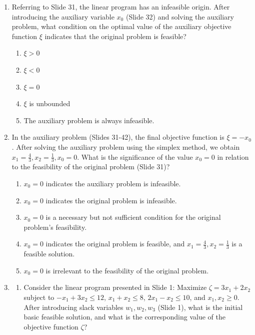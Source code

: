 \documentclass{article}%
\begin{document}
\begin{enumerate}
\begin{enumerate}
\end{enumerate}%
\vspace{1em}%
\item Referring to Slide 31, the linear program has an infeasible origin.  After introducing the auxiliary variable $ x_0 $ (Slide 32) and solving the auxiliary problem, what condition on the optimal value of the auxiliary objective function $ \xi $ indicates that the original problem is feasible?%
\begin{enumerate}%
\item $ \xi > 0 $%
\item $ \xi < 0 $%
\item $ \xi = 0 $%
\item $ \xi $ is unbounded%
\item The auxiliary problem is always infeasible.%
\end{enumerate}%
\vspace{1em}%
\item In the auxiliary problem (Slides 31-42), the final objective function is $ \xi = -x_0 $.  After solving the auxiliary problem using the simplex method, we obtain $ x_1 = \frac{4}{3}, x_2 = \frac{1}{3}, x_0 = 0 $. What is the significance of the value $ x_0 = 0 $ in relation to the feasibility of the original problem (Slide 31)?%
\begin{enumerate}%
\item $ x_0 = 0 $ indicates the auxiliary problem is infeasible.%
\item $ x_0 = 0 $ indicates the original problem is infeasible.%
\item $ x_0 = 0 $ is a necessary but not sufficient condition for the original problem's feasibility.%
\item $ x_0 = 0 $ indicates the original problem is feasible, and $ x_1 = \frac{4}{3}, x_2 = \frac{1}{3} $ is a feasible solution.%
\item $ x_0 = 0 $ is irrelevant to the feasibility of the original problem.%
\end{enumerate}%
\vspace{1em}%
\item%
\begin{enumerate}%
\item Consider the linear program presented in Slide 1: Maximize $ \zeta = 3x_1 + 2x_2 $ subject to $ -x_1 + 3x_2 \le 12 $, $ x_1 + x_2 \le 8 $, $ 2x_1 - x_2 \le 10 $, and $ x_1, x_2 \ge 0 $.  After introducing slack variables $ w_1, w_2, w_3 $ (Slide 1), what is the initial basic feasible solution, and what is the corresponding value of the objective function $ \zeta $?%

\end{enumerate}
\end{enumerate}
\end{document}
